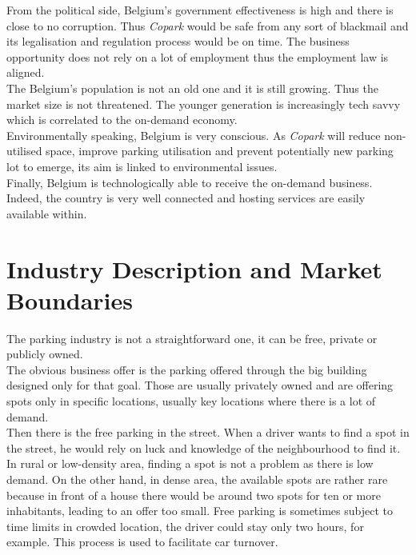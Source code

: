 \documentclass[12pt,a4paper,oneside]{book}
\newcommand{\bp}{\textit{Copark}}
\begin{document}
From the political side, Belgium's government effectiveness is high and there is close to no corruption. Thus \bp{} would be safe from any sort of blackmail and its legalisation and regulation process would be on time. The business opportunity does not rely on a lot of employment thus the employment law is aligned.\\

The Belgium's population is not an old one and it is still growing. Thus the market size is not threatened. The younger generation is increasingly tech savvy which is correlated to the on-demand economy.\\

Environmentally speaking, Belgium is very conscious. As \bp{} will reduce non-utilised space, improve parking utilisation and prevent potentially new parking lot to emerge, its aim is linked to environmental issues.\\

Finally, Belgium is technologically able to receive the on-demand business. Indeed, the country is very well connected and hosting services are easily available within.

\section{Industry Description and Market Boundaries}
The parking industry is not a straightforward one, it can be free, private or publicly owned.\\

The obvious business offer is the parking offered through the big building designed only for that goal. Those are usually privately owned and are offering spots only in specific locations, usually key locations where there is a lot of demand.\\

Then there is the free parking in the street. When a driver wants to find a spot in the street, he would rely on luck and knowledge of the neighbourhood to find it. In rural or low-density area, finding a spot is not a problem as there is low demand. On the other hand, in dense area, the available spots are rather rare because in front of a house there would be around two spots for ten or more inhabitants, leading to an offer too small. Free parking is sometimes subject to time limits in crowded location, the driver could stay only two hours, for example. This process is used to facilitate car turnover.\\
\end{document}
